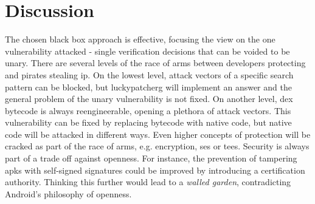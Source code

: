 \section{Discussion} \label{section:conclusion-discussion}
The chosen black box approach is effective, focusing the view on the one vulnerability attacked - single verification decisions that can be voided to be unary.
\newline
\newline
There are several levels of the race of arms between developers protecting and pirates stealing \gls{ip}.
\newline
On the lowest level, attack vectors of a specific search pattern can be blocked, but \gls{luckypatcherg} will implement an answer and the general problem of the unary vulnerability is not fixed.
\newline
On another level, dex bytecode is always reengineerable, opening a plethora of attack vectors.
This vulnerability can be fixed by replacing bytecode with native code, but native code will be attacked in different ways.
\newline
Even higher concepts of protection will be cracked as part of the race of arms, e.g. encryption, \gls{se}s or \gls{tee}s.
\newline
\newline
Security is always part of a trade off against openness.
For instance, the prevention of tampering \gls{apk}s with self-signed signatures could be improved by introducing a certification authority.
Thinking this further would lead to a \textit{walled garden}, contradicting Android’s philosophy of openness.

